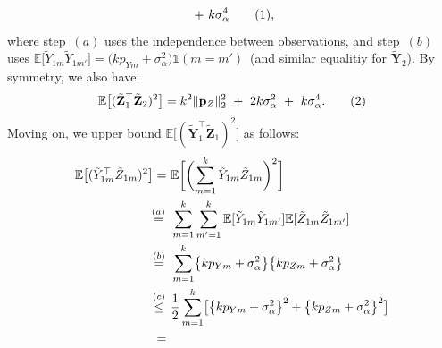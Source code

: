 \documentclass[twoside,11pt]{article}
\newcommand\numberthis{\addtocounter{equation}{1}\tag{\theequation}}
\newcommand{\rvTwo}{Y}
\newcommand{\rvThree}{Z}
\newcommand{\vectorize}[1]{\mathbf{#1}}
\newcommand{\mE}{\mathbb{E}} %
\newcommand{\alphabetSize}{k} %
\newcommand{\vectorIndex}{m}
\newcommand{\probVecElement}[2]{p_{{#1}{#2}}}
\newcommand{\probVec}{\mathbf{p}} %
\newcommand{\privacyParameter}{\alpha} %
\newcommand{\LapUParam}{\sigma_{\privacyParameter}}
\begin{document}
\begin{appendix}
\begin{itemize}
\begin{align*}
		~+~
		\alphabetSize \LapUParam^4	
		\numberthis \label{eq:MYZTwoOne},	
	\end{align*}
	\noindent
	where step~$(a)$ uses the independence between observations, and
	step~$(b)$ uses $
	\mE
	\bigl[
	\tilde{\rvTwo}_{1 \vectorIndex}
	\tilde{\rvTwo}_{1 \vectorIndex'}
	\bigr]
	=
	\bigl(
	\alphabetSize
	\probVecElement{\rvTwo}{\vectorIndex} + \LapUParam^2
	\bigr)
	\mathds{1}(\vectorIndex = \vectorIndex')$~(and similar equalitiy for $\tilde{\vectorize{\rvTwo}}_2$).
	By symmetry, we also have:
	\begin{align*}
		\mE
		\bigl[
		(
		\tilde{\vectorize{\rvThree}}_1^\top 
		\tilde{\vectorize{\rvThree}}_2
		)^2
		\bigr]
		=
		{\alphabetSize}^2 \|\probVec_{\rvThree}\|_2^2
		~+~
		2 {\alphabetSize} \LapUParam^2
		~+~
		\alphabetSize  \LapUParam^4.
		\numberthis \label{eq:MYZTwoTwo}
	\end{align*}
	Moving on, we upper bound $\mE \bigl[ ( \tilde{\vectorize{\rvTwo}}_1^\top \tilde{\vectorize{\rvThree}}_1 )^2 \bigr]$ as follows:
	\begin{align*}
		\mE
		\bigl[
		(
		\tilde{\rvTwo}_{1 \vectorIndex}^\top 
		\tilde{\rvThree}_{1 \vectorIndex}
		)^2
		\bigr]
		= ~&
		\mE
		\biggl[
		\biggl( 
		\sum_{\vectorIndex=1}^{\alphabetSize}
		\tilde{\rvTwo}_{1 \vectorIndex}
		\tilde{\rvThree}_{1 \vectorIndex}
		\biggr)^2
		\biggr]
		\\ \stackrel{(a)}{=} \hskip 1.57mm &
		\sum_{\vectorIndex=1}^{\alphabetSize}
		\sum_{\vectorIndex'=1}^{\alphabetSize}
		\mE
		[
		\tilde{\rvTwo}_{1 \vectorIndex}
		\tilde{\rvTwo}_{1 \vectorIndex'}
		]
		\mE
		[
		\tilde{\rvThree}_{1 \vectorIndex}
		\tilde{\rvThree}_{1 \vectorIndex'}
		]
		\\ \stackrel{(b)}{=} \hskip 1.57mm &
		\sum_{\vectorIndex=1}^{\alphabetSize}
		\bigl\{
		{\alphabetSize} \probVecElement{\rvTwo}{\vectorIndex} + \LapUParam^2
		\bigr\}
		\bigl\{
		{\alphabetSize} \probVecElement{\rvThree}{\vectorIndex} + \LapUParam^2
		\bigr\}
		\\ \stackrel{(c)}{\leq} \hskip 1.57mm &
		\frac{1}{2}
		\sum_{\vectorIndex=1}^{\alphabetSize}
		\bigl[
		\bigl\{
		{\alphabetSize} \probVecElement{\rvTwo}{\vectorIndex} + \LapUParam^2
		\bigr\}^2
		+
		\bigl\{
		{\alphabetSize} \probVecElement{\rvThree}{\vectorIndex} + \LapUParam^2
		\bigr\}^2
		\bigr]
		\\ =~&

\end{align*}
\end{itemize}
\end{appendix}
\end{document}
